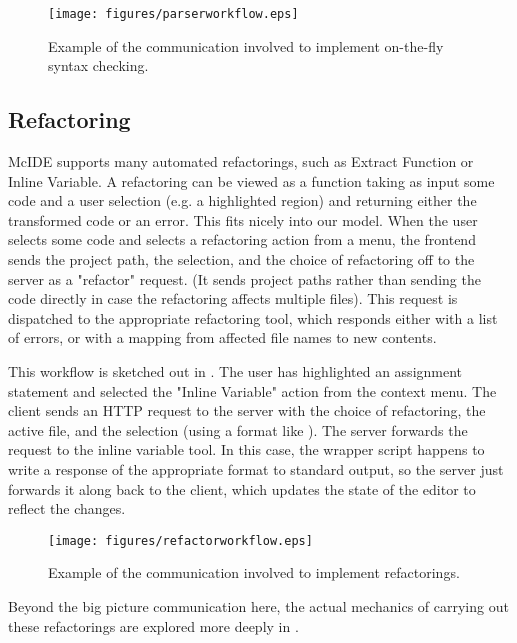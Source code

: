 \begin{figure}
\centering
\texttt{[image: figures/parserworkflow.eps]}
\caption{Example of the communication involved to implement on-the-fly syntax
checking.}
\label{fig:ParserWorkflow}
\end{figure}

\subsection{Refactoring}

McIDE supports many automated refactorings, such as Extract Function or Inline
Variable. A refactoring can be viewed as a function taking as input some code
and a user selection (e.g. a highlighted region) and returning either the
transformed code or an error. This fits nicely into our model. When the user
selects some code and selects a refactoring action from a menu, the frontend
sends the project path, the selection, and the choice of refactoring off to the
server as a "refactor" request. (It sends project paths rather than sending the
code directly in case the refactoring affects multiple files). This request is
dispatched to the appropriate refactoring tool, which responds either with a
list of errors, or with a mapping from affected file names to new contents.

This workflow is sketched out in . The user has
highlighted an assignment statement and selected the "Inline Variable" action
from the context menu. The client sends an HTTP request to the server with the
choice of refactoring, the active file, and the selection (using a format like
). The server
forwards the request to the inline variable tool. In this case, the wrapper
script happens to write a response of the appropriate format to standard
output, so the server just forwards it along back to the client, which updates
the state of the editor to reflect the changes.

\begin{figure}
\centering
\texttt{[image: figures/refactorworkflow.eps]}
\caption{Example of the communication involved to implement refactorings.}
\label{fig:RefactorWorkflow}
\end{figure}

Beyond the big picture communication here, the actual mechanics of carrying out
these refactorings are explored more deeply in
.

